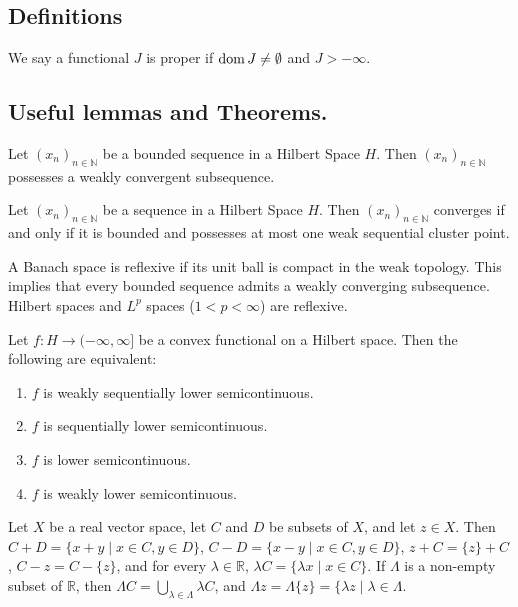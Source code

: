 
\subsection{Definitions}


\begin{definition}
	We say a functional $J$ is proper if $\mathrm{dom\,} J \neq \emptyset$ and $J>-\infty$.
\end{definition}
\subsection{Useful lemmas and Theorems.}
\begin{lemma}
	\label{lemma0. Bounded and weakly convergent}
	Let $(x_n)_{n \in \mathbb{N}}$ be a bounded sequence in a Hilbert Space $H$. Then $(x_n)_{n \in \mathbb{N}}$ possesses a weakly convergent subsequence.
\end{lemma}

\begin{lemma}
Let $(x_n)_{n \in \mathbb{N}}$ be a sequence in a Hilbert Space $H$. Then $(x_n)_{n \in \mathbb{N}}$ converges if and only if it is bounded and possesses at most one weak sequential cluster point.
\end{lemma}
\begin{fact}
	A Banach space is reflexive if its unit ball is compact in the weak topology. This implies that every bounded sequence admits a weakly converging subsequence. Hilbert spaces and $L^p$ spaces ($1<p<\infty$) are reflexive.
\end{fact}
\begin{theorem} 
	Let $f: H \rightarrow (−\infty, \infty]$ be a convex functional on a Hilbert space. Then the following are equivalent:
	\begin{enumerate}[label=(\roman{*})]
\item 	$f$ is weakly sequentially lower semicontinuous.
\item 	$f$ is sequentially lower semicontinuous.
\item 	$f$ is lower semicontinuous.
\item 	$f$ is weakly lower semicontinuous.
	\end{enumerate}
\end{theorem}

Let $X$ be a real  vector space, let $C$ and $D$ be subsets of $X$, and let $z \in X$. Then
 $C + D =\lbrace x + y \mid x \in C, y \in D\rbrace$, $C -D =\lbrace x - y \mid x \in C, y \in D\rbrace$,
$z+C=\lbrace z \rbrace +C$, $C-z=C-\lbrace z \rbrace$, and for every $\lambda \in \mathbb{R}$, $\lambda C =\lbrace\lambda x \mid x \in C\rbrace$. If $\Lambda$ is a non-empty subset of $\mathbb{R}$, then $\Lambda C = \bigcup_{\lambda \in \Lambda}\lambda C$, and $\Lambda z = \Lambda \lbrace z \rbrace =\lbrace\lambda z \mid \lambda \in \Lambda$.


